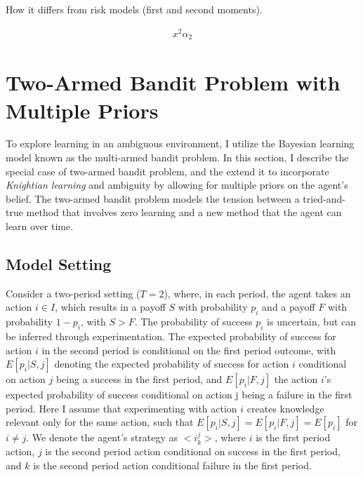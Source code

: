 \documentclass[11pt]{article} %
\theoremstyle{exampstyle}
\newcommand{\eq}[1]{\begin{align}#1\end{align}}
\begin{document}
How it differs from risk models (first and second moments). 

\eq{ x^2 \alpha_2} 


\section{Two-Armed Bandit Problem with Multiple Priors}
\label{bandit}
To explore learning in an ambiguous environment, I utilize the Bayesian learning model known as the multi-armed bandit problem. In this section, I describe the special case of two-armed bandit problem, and the extend it to incorporate \emph{Knightian learning} and ambiguity by allowing for multiple priors on the agent's belief. The two-armed bandit problem models the tension between a tried-and-true method that involves zero learning and a new method that the agent can learn over time. 

\subsection{Model Setting}

Consider a two-period setting ($T=2$), where, in each period, the agent takes an action $ i \in I$, which results in a payoff $S$ with probability $p_i$ and a payoff $F$ with probability $1-p_i$, with $S>F$. The probability of success $p_i$ is uncertain, but can be inferred through experimentation. The expected probability of success for action $i$ in the second period is conditional on the first period outcome, with $E[p_i | S, j]$ denoting the expected probability of success for action $i$ conditional on action $j$ being a success in the first period, and $E[p_i | F, j]$ the action $i$'s expected probability of success conditional on action j being a failure in the first period. Here I assume that experimenting with action $i$ creates knowledge relevant only for the same action, such that $E[p_i | S, j] = E[p_i | F, j] = E[p_i]$ for $i \neq j$. We denote the agent's strategy as $<\!i^j_k\!>$, where $i$ is the first period action, $j$ is the second period action conditional on success in the first period, and $k$ is the second period action conditional failure in the first period. 
\end{document}
